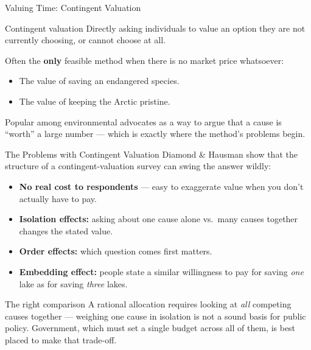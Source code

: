\documentclass[11pt,aspectratio=169]{beamer}
\begin{document}
\begin{frame}{Valuing Time: Contingent Valuation}
  \begin{block}{Contingent valuation}
    Directly asking individuals to value an option they are not currently choosing, or cannot choose at all.
  \end{block}
  \vspace{0.4em}
  Often the \textbf{only} feasible method when there is no market price whatsoever:
  \begin{itemize}
    \item The value of saving an endangered species.
    \item The value of keeping the Arctic pristine.
  \end{itemize}
  \small Popular among environmental advocates as a way to argue that a cause is ``worth'' a large number --- which is exactly where the method's problems begin.
\end{frame}

\begin{frame}{The Problems with Contingent Valuation}
  \small
  Diamond \& Hausman show that the structure of a contingent-valuation survey can swing the answer wildly:
  \begin{itemize}
    \setlength{\itemsep}{2pt}
    \item \textbf{No real cost to respondents} --- easy to exaggerate value when you don't actually have to pay.
    \item \textbf{Isolation effects:} asking about one cause alone vs.\ many causes together changes the stated value.
    \item \textbf{Order effects:} which question comes first matters.
    \item \textbf{Embedding effect:} people state a similar willingness to pay for saving \emph{one} lake as for saving \emph{three} lakes.
  \end{itemize}
  \vspace{0.3em}
  \begin{alertblock}{The right comparison}
    A rational allocation requires looking at \emph{all} competing causes together --- weighing one cause in isolation is not a sound basis for public policy. Government, which must set a single budget across all of them, is best placed to make that trade-off.
  \end{alertblock}
\end{frame}
\end{document}

